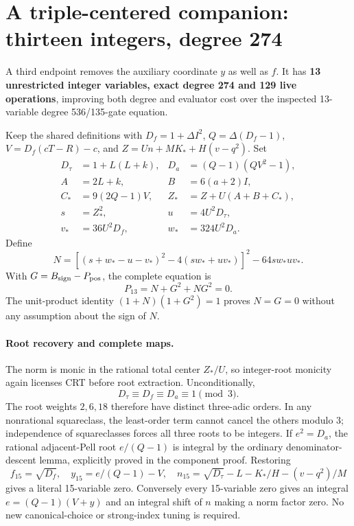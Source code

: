\section{A triple-centered companion: thirteen integers, degree 274}
\label{sec:triple-carrier}
A third endpoint removes the auxiliary coordinate $y$ as well as $f$.
It has \textbf{13 unrestricted integer variables, exact degree 274 and 129
live operations}, improving both degree and evaluator cost over the inspected
13-variable degree 536/135-gate equation.

Keep the shared definitions with $D_f=1+\Delta I^2$, $Q=\Delta(D_f-1)$,
$V=D_f(cT-R)-c$, and $Z=Un+MK_*+H(v-q^2)$.  Set
\begin{align*}
 D_\tau&=1+L(L+k),&D_a&=(Q-1)(QV^2-1),\\
 A&=2L+k,&B&=6(a+2)I,\\
 C_*&=9(2Q-1)V,&Z_*&=Z+U(A+B+C_*),\\
 s&=Z_*^2,&u&=4U^2D_\tau,\\
 v_*&=36U^2D_f,&w_*&=324U^2D_a.
\end{align*}
Define
\[
 N=[(s+w_*-u-v_*)^2-4(sw_*+uv_*)]^2-64sw_*uv_*.
\]
With $G=B_{\rm sign}-P_{\rm pos}$, the complete equation is
\[
 \boxed{P_{13}=N+G^2+NG^2=0.}
\]
The unit-product identity $(1+N)(1+G^2)=1$ proves $N=G=0$ without any
assumption about the sign of $N$.

\paragraph{Root recovery and complete maps.}
The norm is monic in the rational total center $Z_*/U$, so integer-root
monicity again licenses CRT before root extraction.  Unconditionally,
\[
 D_\tau\equiv D_f\equiv D_a\equiv1\pmod3.
\]
The root weights $2,6,18$ therefore have distinct three-adic orders.
In any nonrational squareclass, the least-order term cannot cancel the
others modulo 3; independence of squareclasses forces all three roots to be
integers.  If $e^2=D_a$, the rational adjacent-Pell root
$e/(Q-1)$ is integral by the ordinary denominator-descent lemma, explicitly
proved in the component proof.  Restoring
\[
 f_{15}=\sqrt{D_f},\quad
 y_{15}=e/(Q-1)-V,\quad
 n_{15}=\sqrt{D_\tau}-L-K_*/H-(v-q^2)/M
\]
gives a literal 15-variable zero.  Conversely every 15-variable zero gives
an integral $e=(Q-1)(V+y)$ and an integral shift of $n$ making a norm factor
zero.  No new canonical-choice or strong-index tuning is required.

